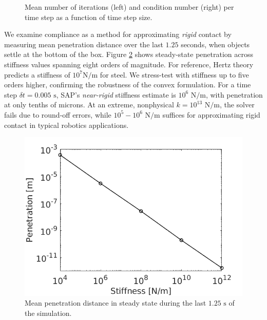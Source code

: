 \begin{figure}[!h]
    \centering
    \caption{\label{fig:clutter_mean_iters_cn} Mean number of iterations (left) and
    condition number (right) per time step as a function of time step size.}
\end{figure}


We examine compliance as a method for approximating \emph{rigid} contact by
measuring mean penetration distance over the last $1.25$ seconds, when objects
settle at the bottom of the box. Figure \ref{fig:clutter_penetration_study}
shows steady-state penetration across stiffness values spanning eight orders of
magnitude. For reference, Hertz theory predicts a stiffness of $10^7\text{
N}/\text{m}$ for steel. We stress-test with stiffness up to five orders higher,
confirming the robustness of the convex formulation. For a time step $\delta
t=0.005\text{ s}$, SAP’s \emph{near-rigid} \cite{bib:castro2022unconstrained}
stiffness estimate is $10^6\text{ N}/\text{m}$, with penetration at only tenths
of microns. At an extreme, nonphysical $k=10^{13}\text{ N}/\text{m}$, the solver
fails due to round-off errors, while $10^5-10^6\text{ N}/\text{m}$ suffices for
approximating rigid contact in typical robotics applications.

\begin{figure}[!h]
    \centering
    \includegraphics[width=0.8\columnwidth]{figures/TestCases/Clutter/StiffnessStudy/steady_state_penetration.png}
    \caption{Mean penetration distance in steady state during the last $1.25\text{ s}$
    of the simulation.}
    \label{fig:clutter_penetration_study}
\end{figure}

